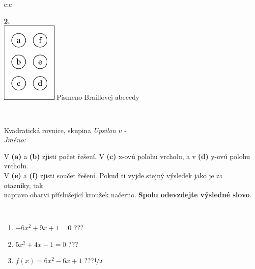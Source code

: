 \documentclass[10pt]{report}
\begin{document}
\begin{tabular}{c:c}
\begin{minipage}[c][104.5mm][t]{0.5\linewidth}
\begin{center}
\begin{minipage}{0.20\linewidth}
\begin{center}
{\Huge\bfseries 2.} \\[2mm]
\includegraphics[height=40mm]{../images/braille.png}
{\small Písmeno Braillovej abecedy}
\end{center}
\end{minipage}
\end{center}
\end{minipage}
\\ \hdashline
\begin{minipage}[c][104.5mm][t]{0.5\linewidth}
\begin{center}
\vspace{7mm}
{\huge Kvadratická rovnice, skupina \textit{Upsilon $\upsilon$} -}\\[5mm]
\textit{Jméno:}\phantom{xxxxxxxxxxxxxxxxxxxxxxxxxxxxxxxxxxxxxxxxxxxxxxxxxxxxxxxxxxxxxxxxx}\\[5mm]
\begin{minipage}{0.95\linewidth}
\begin{center}
V \textbf{(a)} a \textbf{(b)} zjisti počet řešení. V \textbf{(c)} x-ovú polohu vrcholu, a v \textbf{(d)} y-ovú polohu vrcholu.\\V \textbf{(e)} a \textbf{(f)} zjisti součet řešení. Pokud ti vyjde stejný výsledek jako je za otazníky, tak\\napravo obarvi příslušející kroužek načerno. \textbf{Spolu odevzdejte výsledné slovo}.
\end{center}
\end{minipage}
\\[1mm]
\begin{minipage}{0.79\linewidth}
\begin{center}
\begin{varwidth}{\linewidth}
\begin{enumerate}
\Large
\item $-6x^2+9x+1=0$\quad \dotfill\; ???\;\dotfill {}
\item $5x^2+4x-1=0$\quad \dotfill\; ???\;\dotfill {}
\item $f(x)=6x^2-6x+1$\quad \dotfill\; ???\;\dotfill \quad $\nicefrac{1}{2}$

\end{enumerate}
\end{varwidth}
\end{center}
\end{minipage}
\end{center}
\end{minipage}
\end{tabular}
\end{document}
